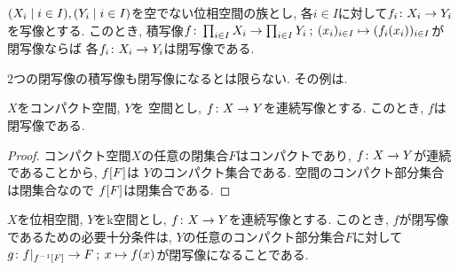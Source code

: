 \documentclass[uplatex, dvipdfmx, a4paper, 12pt, class=jsbook, crop=false]{standalone}
\begin{document}
\begin{proposition}
    $ \setfamily{X_i}{i \in I}, \setfamily{Y_i}{i \in I} $を空でない位相空間の族とし,
    各$ i \in I $に対して$ f_i\colon X_i\to Y_i $を写像とする.
    このとき, 積写像$ \morph{f}{\prod_{i \in I} X_i}{\prod_{i \in I} Y_i}
    \semicolon (x_i)_{i \in I} \mapsto (\mappt{f_i}{x_i})_{i \in I} $が閉写像ならば
    各$ f_i\colon X_i\to Y_i $は閉写像である.
\end{proposition}

\begin{example}
    2つの閉写像の積写像も閉写像になるとは限らない. その例は\WIP.
\end{example}

\begin{proposition}
    $ X $をコンパクト空間, $ Y $を \Hausdorff 空間とし, $ f\colon X\to Y $を連続写像とする.
    このとき, $ f $は閉写像である.
\end{proposition}

\begin{proof}
    コンパクト空間$ X $の任意の閉集合$ F $はコンパクトであり,
    $ f\colon X\to Y $が連続であることから, $ \mapset{f}{F} $は
    $ Y $のコンパクト集合である. \Hausdorff 空間のコンパクト部分集合は閉集合なので
    $ \mapset{f}{F} $は閉集合である.
\end{proof}

\begin{proposition}
    $ X $を位相空間, $ Y $をk空間とし, $ f\colon X\to Y $を連続写像とする.
    このとき, $ f $が閉写像であるための必要十分条件は, $ Y $の任意のコンパクト部分集合$ F $に対して
    $ \morph{g}{f|_{\mapinvset{f}{F}}}{F} \semicolon x \mapsto \mappt{f}{x} $が閉写像になることである.
\end{proposition}
\end{document}

